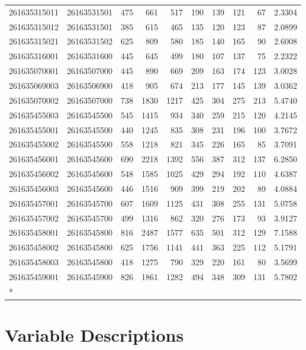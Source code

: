 \documentclass[
  11pt,
]{article}
\begin{document}
\begin{longtable}[t]{llrrrrrrrr}
261635315011 & 26163531501 & 475 & 661 & 517 & 190 & 139 & 121 & 67 & 2.3304\\
261635315012 & 26163531501 & 385 & 615 & 465 & 135 & 120 & 123 & 87 & 2.0899\\
261635315021 & 26163531502 & 625 & 809 & 580 & 185 & 140 & 165 & 90 & 2.6008\\
261635316001 & 26163531600 & 445 & 645 & 499 & 180 & 107 & 137 & 75 & 2.2322\\
261635070001 & 26163507000 & 445 & 890 & 669 & 209 & 163 & 174 & 123 & 3.0028\\
261635069003 & 26163506900 & 418 & 905 & 674 & 213 & 177 & 145 & 139 & 3.0362\\
261635070002 & 26163507000 & 738 & 1830 & 1217 & 425 & 304 & 275 & 213 & 5.4740\\
261635455003 & 26163545500 & 545 & 1415 & 934 & 340 & 259 & 215 & 120 & 4.2145\\
261635455001 & 26163545500 & 440 & 1245 & 835 & 308 & 231 & 196 & 100 & 3.7672\\
261635455002 & 26163545500 & 558 & 1218 & 821 & 345 & 226 & 165 & 85 & 3.7091\\
261635456001 & 26163545600 & 690 & 2218 & 1392 & 556 & 387 & 312 & 137 & 6.2850\\
261635456002 & 26163545600 & 548 & 1585 & 1025 & 429 & 294 & 192 & 110 & 4.6387\\
261635456003 & 26163545600 & 446 & 1516 & 909 & 399 & 219 & 202 & 89 & 4.0884\\
261635457001 & 26163545700 & 607 & 1609 & 1125 & 431 & 308 & 255 & 131 & 5.0758\\
261635457002 & 26163545700 & 499 & 1316 & 862 & 320 & 276 & 173 & 93 & 3.9127\\
261635458001 & 26163545800 & 816 & 2487 & 1577 & 635 & 501 & 312 & 129 & 7.1588\\
261635458002 & 26163545800 & 625 & 1756 & 1141 & 441 & 363 & 225 & 112 & 5.1791\\
261635458003 & 26163545800 & 418 & 1275 & 790 & 329 & 220 & 161 & 80 & 3.5699\\
261635459001 & 26163545900 & 826 & 1861 & 1282 & 494 & 348 & 309 & 131 & 5.7802\\*
\end{longtable}
\endgroup{}

\newpage

\section{Variable Descriptions}\label{variable-descriptions}
\end{document}
